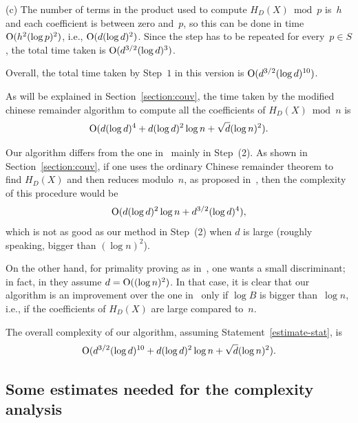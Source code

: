 \documentclass{amsart}
\newcommand{\noi}{\noindent}
\newcommand{\bigo}{{\rm O}}
\theoremstyle{plain}
\begin{document}
\noi (c) 
The number of terms in the product used to compute
$H_D(X) \bmod{p}$ is~$h$ and each coefficient
is between zero and~$p$, so this can be done in time 
$\bigo (h^2 (\log p)^2)$, i.e., $\bigo(d (\log d)^2)$.
Since the step has to be repeated for every~$p\in S$,
the total time taken is $\bigo(d^{3/2} (\log d)^3)$.

\vspace{0.1in}
Overall, the total time taken by Step~$1$ in this version
is $\bigo(d^{3/2} (\log d)^{10})$.

\vspace{0.1in}
\noi {\bf Step~(2)} 
As will be explained in Section~\ref{section:couv},
the time taken by the modified chinese remainder algorithm to compute
all the coefficients of $H_D (X) \bmod n$ is
$$\bigo(d (\log d)^4  + d (\log d)^2 \log n + \sqrt{d} (\log n)^2 ).$$

\vspace{0.1in}

Our algorithm differs from the one in~\cite[\S4]{cnst} mainly in Step~(2).
As shown in Section~\ref{section:couv}, 
if one uses the ordinary Chinese remainder theorem
to find $H_D(X)$ and then reduces modulo~$n$, as proposed in~\cite[\S4]{cnst},
then the complexity of this procedure would be
$$\bigo( d (\log d)^2 \log n + d^{3/2} (\log d)^4  ),$$
which is not as good as our method in Step~(2) 
when $d$ is large (roughly speaking, bigger than $(\log n)^2$).

On the other hand, for primality proving as in~\cite{atmor},
one wants a small discriminant; in fact, in 
\cite[\S5.10]{ll} they assume $d = \bigo( (\log n)^2)$. 
In that case, it is clear that our algorithm is an improvement over the one in~\cite[\S4]{cnst}
only if $\log B$ is bigger than~$\log n$, i.e., if 
the coefficients of $H_D(X)$ are large compared to~$n$. 

The overall complexity of our algorithm, assuming 
Statement~\ref{estimate-stat}, is
$$\bigo(d^{3/2} (\log d)^{10} + d (\log d)^2 \log n + \sqrt{d} (\log n)^2 ).$$

\subsection{Some estimates needed for the complexity analysis}
\label{estimates}
\end{document}

